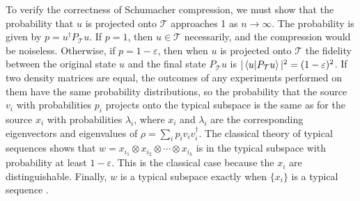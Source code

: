\documentclass[a4paper, 12pt]{article}
\numberwithin{equation}{section}
\numberwithin{figure}{section}
\theoremstyle{definition}
\begin{document}
    To verify the correctness of Schumacher compression, we must show that the probability that $u$ is projected onto $\mathcal{T}$ approaches 1 as $n \to \infty$. The probability is given by $p = u^\dagger P_\mathcal{T} u$. If $p = 1$, then $u \in \mathcal{T}$ necessarily, and the compression would be noiseless. Otherwise, if $p = 1 - \varepsilon$, then when $u$ is projected onto $\mathcal{T}$ the fidelity between the original state $u$ and the final state $P_\mathcal{T} u$ is $|\braket{u}{P_\mathcal{T} u}|^2 = (1 - \varepsilon)^2$. If two density matrices are equal, the outcomes of any experiments performed on them have the same probability distributions, so the probability that the source $v_i$ with probabilities $p_i$ projects onto the typical subspace is the same as for the source $x_i$ with probabilities $\lambda_i$, where $x_i$ and $\lambda_i$ are the corresponding eigenvectors and eigenvalues of $\rho = \sum_i p_i v_i v_i^\dagger$. The classical theory of typical sequences shows that $w = x_{i_1} \otimes x_{i_2} \otimes \cdots \otimes x_{i_k}$ is in the typical subspace with probability at least $1 - \varepsilon$. This is the classical case because the $x_i$ are distinguishable. Finally, $w$ is a typical subspace exactly when $\{ x_i \}$ is a typical sequence \cite{shor}. \par
\end{document}
